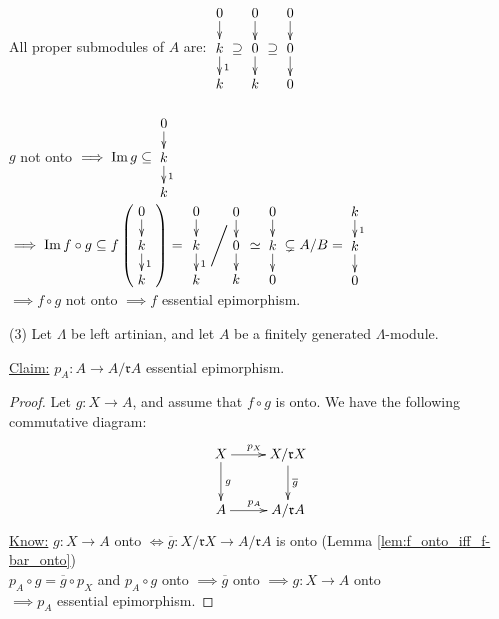 \begin{exam}
All proper submodules of $A$ are: 
$\vcenter{\xymatrix@C-2pc@R-1pc
{
0\ar[d] && 0\ar[d] && 0\ar[d]\\
k\ar[d]^1 &\supseteq& 0\ar[d] &\supseteq& 0\ar[d]\\
k && k && 0\\
}}$\\
\\
$g$ not onto $\implies \Im g \subseteq \vcenter{\xymatrix@C-2pc@R-1pc
{
0\ar[d] \\
k\ar[d]^1 \\
k \\
}}$\\
$\implies \Im f \circ g \subseteq f\left(\vcenter{\xymatrix@C-2pc@R-1pc
{
0\ar[d] \\
k\ar[d]^1 \\
k \\
}}\right) 
=
\left.
\vcenter{\xymatrix@C-2pc@R-1pc
{
0\ar[d] \\
k\ar[d]^1 \\
k \\
}}
\middle/
\vcenter{\xymatrix@C-2pc@R-1pc
{
0\ar[d] \\
0\ar[d] \\
k \\
}}
\right.
\simeq
\vcenter{\xymatrix@C-2pc@R-1pc
{
0\ar[d] \\
k\ar[d] \\
0 \\
}}
\subsetneq 
A/B
=
\vcenter{\xymatrix@C-2pc@R-1pc
{
k\ar[d]^1 \\
k\ar[d] \\
0 \\
}}
$\\

$\implies f \circ g$ not onto $\implies f$ essential epimorphism.

(3) Let $\Lambda$ be left artinian, and let $A$ be a finitely
generated $\Lambda$-module.

\underline{Claim:} $p_A \colon A \to A / \mathfrak{r}A$ essential epimorphism.
\begin{proof}
Let $g\colon X \to A$, and assume that $f \circ g$ is onto. We have the
following commutative diagram:
$$
\xymatrix{
X\ar[d]^g \ar[r]^{p_X} & X/\mathfrak{r}X \ar[d]^{\overline{g}}\\
A\ar[r]^{p_A} & A/\mathfrak{r}A\\
}
$$
\underline{Know:} $g\colon X \to A$ onto $\iff \overline{g}\colon X / \mathfrak{r} X \to A / \mathfrak{r}A$ is onto (Lemma \ref{lem:f_onto_iff_f-bar_onto})\\
$p_A \circ g = \overline{g}\circ p_X$ and $p_A \circ g$ onto $\implies
\overline{g}$ onto $\implies g\colon X \to A$ onto \\
$\implies p_A$ essential epimorphism.
\end{proof}
\end{exam}

